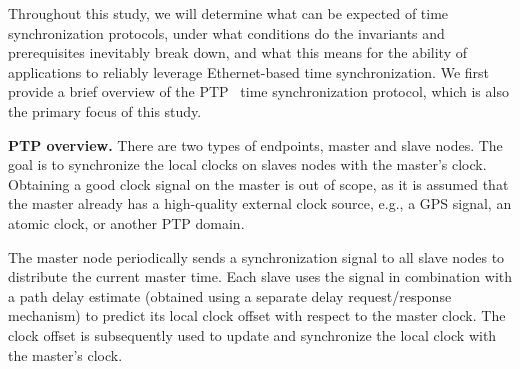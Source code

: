 Throughout this study, we will determine what can be expected of time
synchronization protocols,
under what conditions do the invariants and prerequisites inevitably break down,
and what this means for the ability of applications to reliably leverage
Ethernet-based time synchronization.
We first provide a brief overview of the
PTP~\cite{ptp-spec} time synchronization protocol,
which is also the primary focus of this study.


\textbf{PTP overview.}
There are two types of endpoints, master and slave nodes.
The goal is to synchronize the local clocks on slaves nodes with the master's
clock.
Obtaining a good clock signal on the master is out of scope, %
as it is assumed that the master already has a high-quality external clock source,
e.g., a GPS signal, an atomic clock, or another PTP domain.

The master node periodically sends a synchronization signal to all slave nodes
to distribute the current master time.
Each slave uses the signal in combination with a path delay estimate
(obtained using a separate delay request/response mechanism)
to predict its local clock offset with respect to the master clock.
The clock offset is subsequently used to update and synchronize the local clock
with the master's clock.


